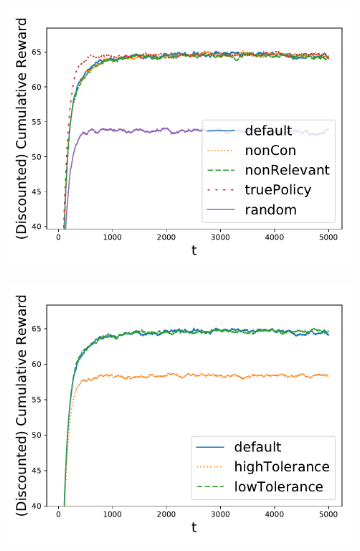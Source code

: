 \documentclass{article}
\begin{document}
		\begin{figure}
			\begin{subfigure}{0.333\textwidth}
				\includegraphics[width=\textwidth]{mediumDNRewardsConservativity}
				\caption{}
			\end{subfigure}
			\begin{subfigure}{0.333\textwidth}
				\includegraphics[width=\textwidth]{mediumDNRewardsTolerance}
				\caption{}
			\end{subfigure}
			\begin{subfigure}{0.333\textwidth}

\end{subfigure}
\end{figure}
\end{document}
